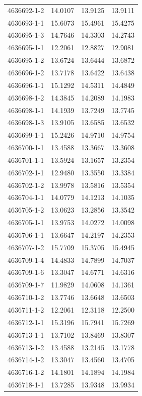 \begin{longtable}{lrrr}
4636692-1-2 & 14.0107 & 13.9125 & 13.9111 \\
4636693-1-1 & 15.6073 & 15.4961 & 15.4275 \\
4636695-1-3 & 14.7646 & 14.3303 & 14.2743 \\
4636695-1-1 & 12.2061 & 12.8827 & 12.9081 \\
4636695-1-2 & 13.6724 & 13.6444 & 13.6872 \\
4636696-1-2 & 13.7178 & 13.6422 & 13.6438 \\
4636696-1-1 & 15.1292 & 14.5311 & 14.4849 \\
4636698-1-2 & 14.3845 & 14.2089 & 14.1983 \\
4636698-1-1 & 14.1939 & 13.7249 & 13.7745 \\
4636698-1-3 & 13.9105 & 13.6585 & 13.6532 \\
4636699-1-1 & 15.2426 & 14.9710 & 14.9754 \\
4636700-1-1 & 13.4588 & 13.3667 & 13.3608 \\
4636701-1-1 & 13.5924 & 13.1657 & 13.2354 \\
4636702-1-1 & 12.9480 & 13.3550 & 13.3384 \\
4636702-1-2 & 13.9978 & 13.5816 & 13.5354 \\
4636704-1-1 & 14.0779 & 14.1213 & 14.1035 \\
4636705-1-2 & 13.0623 & 13.2856 & 13.3542 \\
4636705-1-1 & 13.9753 & 14.0272 & 14.0098 \\
4636706-1-1 & 13.6647 & 14.2197 & 14.2353 \\
4636707-1-2 & 15.7709 & 15.3705 & 15.4945 \\
4636709-1-4 & 14.4833 & 14.7899 & 14.7037 \\
4636709-1-6 & 13.3047 & 14.6771 & 14.6316 \\
4636709-1-7 & 11.9829 & 14.0608 & 14.1361 \\
4636710-1-2 & 13.7746 & 13.6648 & 13.6503 \\
4636711-1-2 & 12.2061 & 12.3118 & 12.2500 \\
4636712-1-1 & 15.3196 & 15.7941 & 15.7269 \\
4636713-1-1 & 13.7102 & 13.8469 & 13.8307 \\
4636713-1-2 & 13.4588 & 13.2145 & 13.1778 \\
4636714-1-2 & 13.3047 & 13.4560 & 13.4705 \\
4636716-1-2 & 14.1801 & 14.1894 & 14.1984 \\
4636718-1-1 & 13.7285 & 13.9348 & 13.9934 \\

\end{longtable}
